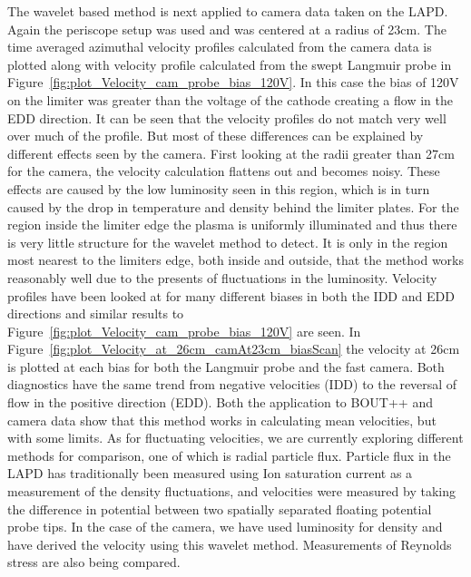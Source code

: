 \documentclass[%
 reprint,
 amsmath,amssymb,
 aps,
]{revtex4-1}
\begin{document}
The wavelet based method is next applied to camera data taken on the LAPD. Again the periscope setup was used and was centered at a radius of 23cm. The time averaged azimuthal velocity profiles calculated from the camera data is plotted along with velocity profile calculated from the swept Langmuir probe in Figure~\ref{fig:plot_Velocity_cam_probe_bias_120V}. In this case the bias of 120V on the limiter was greater than the voltage of the cathode creating a flow in the EDD direction.  It can be seen that the velocity profiles do not match very well over much of the profile.  But most of these differences can be explained by different effects seen by the camera.  First looking at the radii greater than 27cm for the camera, the velocity calculation flattens out and becomes noisy.  These effects are caused by the low luminosity seen in this region, which is in turn caused by the drop in temperature and density behind the limiter plates.  For the region inside the limiter edge the plasma is uniformly illuminated and thus there is very little structure for the wavelet method to detect.  It is only in the region most nearest to the limiters edge, both inside and outside, that the method works reasonably well due to the presents of fluctuations in the luminosity.   Velocity profiles have been looked at for many different biases in both the IDD and EDD directions and similar results to Figure~\ref{fig:plot_Velocity_cam_probe_bias_120V} are seen. In Figure~\ref{fig:plot_Velocity_at_26cm_camAt23cm_biasScan} the  velocity at 26cm is plotted at each bias for both the Langmuir probe and the fast camera.  Both diagnostics have the same trend from negative velocities (IDD) to the reversal of flow in the positive direction (EDD). Both the application to BOUT++ and camera data show that this method works in calculating mean velocities, but with some limits.  As for fluctuating velocities, we are currently exploring different methods for comparison, one of which is radial particle flux. Particle flux in the LAPD has traditionally been measured using Ion saturation current as a measurement of the density fluctuations, and velocities were measured by taking the difference in potential between two spatially separated floating potential probe tips. In the case of the camera, we have used luminosity for density and have derived the velocity using this wavelet method.  Measurements of Reynolds stress are also being compared. 
\end{document}
